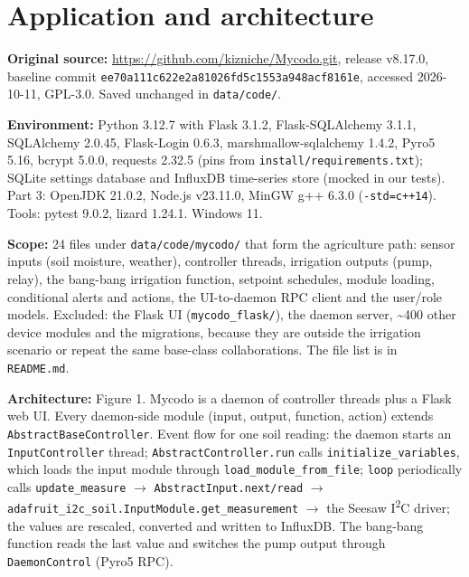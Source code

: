 \documentclass[11pt,a4paper]{article}
\newcommand{\field}[2]{\textbf{#1:} #2\par}
\begin{document}
\section{Application and architecture}
\field{Original source}{\url{https://github.com/kizniche/Mycodo.git}, release v8.17.0, baseline commit \texttt{ee70a111c622e2a81026fd5c1553a948acf8161e}, accessed 2026-10-11, GPL-3.0. Saved unchanged in \texttt{data/\allowbreak{}code/\allowbreak{}}.}
\field{Environment}{Python 3.12.7 with Flask 3.1.2, Flask-SQLAlchemy 3.1.1, SQLAlchemy 2.0.45, Flask-Login 0.6.3, marshmallow-sqlalchemy 1.4.2, Pyro5 5.16, bcrypt 5.0.0, requests 2.32.5 (pins from \texttt{install/\allowbreak{}requirements.\allowbreak{}txt}); SQLite settings database and InfluxDB time-series store (mocked in our tests). Part 3: OpenJDK 21.0.2, Node.js v23.11.0, MinGW g++ 6.3.0 (\texttt{-std=c++14}). Tools: pytest 9.0.2, lizard 1.24.1. Windows 11.}
\field{Scope}{24 files under \texttt{data/\allowbreak{}code/\allowbreak{}mycodo/\allowbreak{}} that form the agriculture path: sensor inputs (soil moisture, weather), controller threads, irrigation outputs (pump, relay), the bang-bang irrigation function, setpoint schedules, module loading, conditional alerts and actions, the UI-to-daemon RPC client and the user/role models. Excluded: the Flask UI (\texttt{mycodo\_\allowbreak{}flask/\allowbreak{}}), the daemon server, \textasciitilde{}400 other device modules and the migrations, because they are outside the irrigation scenario or repeat the same base-class collaborations. The file list is in \texttt{README.\allowbreak{}md}.}
\field{Architecture}{Figure 1. Mycodo is a daemon of controller threads plus a Flask web UI. Every daemon-side module (input, output, function, action) extends \texttt{AbstractBaseController}. Event flow for one soil reading: the daemon starts an \texttt{InputController} thread; \texttt{AbstractController.\allowbreak{}run} calls \texttt{initialize\_\allowbreak{}variables}, which loads the input module through \texttt{load\_\allowbreak{}module\_\allowbreak{}from\_\allowbreak{}file}; \texttt{loop} periodically calls \texttt{update\_\allowbreak{}measure} $\rightarrow$ \texttt{AbstractInput.\allowbreak{}next/\allowbreak{}read} $\rightarrow$ \texttt{adafruit\_\allowbreak{}i2c\_\allowbreak{}soil.\allowbreak{}InputModule.\allowbreak{}get\_\allowbreak{}measurement} $\rightarrow$ the Seesaw I\textsuperscript{2}C driver; the values are rescaled, converted and written to InfluxDB. The bang-bang function reads the last value and switches the pump output through \texttt{DaemonControl} (Pyro5 RPC).}
\end{document}
